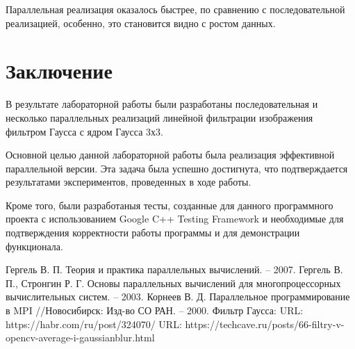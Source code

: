 \documentclass{report}
\begin{document}
\par Параллельная реализация оказалось быстрее, по сравнению с последовательной реализацией, особенно, это становится видно с ростом данных. 
\newpage

\section*{Заключение}
В результате лабораторной работы были разработаны последовательная и несколько параллельных реализаций линейной фильтрации изображения фильтром Гаусса с ядром Гаусса 3х3.
\par Основной целью данной лабораторной работы была реализация эффективной параллельной версии. Эта задача была успешно достигнута, что подтверждается результатами экспериментов, проведенных в ходе работы.
\par Кроме того, были разработаныя тесты, созданные для данного программного проекта с использованием Google C++ Testing Framework и необходимые для подтверждения корректности работы программы и для демонстрации функционала.
\newpage

\begin{thebibliography}{1}
Гергель В. П. Теория и практика параллельных вычислений. – 2007. 
Гергель В. П., Стронгин Р. Г. Основы параллельных вычислений для многопроцессорных вычислительных систем. – 2003.
Корнеев В. Д. Параллельное программирование в MPI //Новосибирск: Изд-во СО РАН. – 2000.
Фильтр Гаусса: URL: https://habr.com/ru/post/324070/
URL: https://techcave.ru/posts/66-filtry-v-opencv-average-i-gaussianblur.html
\end{thebibliography}
\newpage

\end{document}
